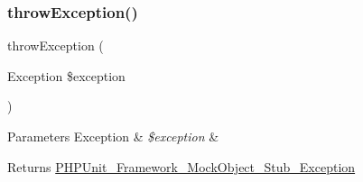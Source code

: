 \subsubsection{\texorpdfstring{throw\+Exception()}{throwException()}}
{\footnotesize\ttfamily throw\+Exception (\begin{DoxyParamCaption}\item[{Exception}]{\$exception }\end{DoxyParamCaption})}


\begin{DoxyParams}[1]{Parameters}
Exception & {\em \$exception} & \\
\hline
\end{DoxyParams}
\begin{DoxyReturn}{Returns}
\mbox{\hyperlink{class_p_h_p_unit___framework___mock_object___stub___exception}{P\+H\+P\+Unit\+\_\+\+Framework\+\_\+\+Mock\+Object\+\_\+\+Stub\+\_\+\+Exception}} 
\end{DoxyReturn}

